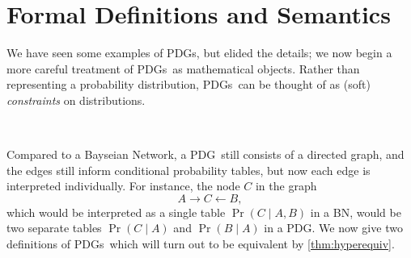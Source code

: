 \documentclass{article}
\newcommand{\MN}{PDG}
\newcommand{\MNs}{\MN s}
\begin{document}
	
	



	
	
	\section{Formal Definitions and Semantics}\label{sec:formal+semantics}
	
	
	We have seen some examples of \MNs, but elided the details; we now begin a more careful treatment of \MNs\ as mathematical objects. Rather than representing a probability distribution, \MNs\ can be thought of as (soft) \emph{constraints} on distributions.

	
	
	
	
	\todo\
	
	
	Compared to a Bayseian Network, a \MN\ still consists of a directed graph, and the edges still inform conditional probability tables, but now each edge is interpreted individually. For instance, the node $C$ in the graph
	\[ A \!\rightarrow\! C \!\leftarrow\! B,\]
	which would be interpreted as a single table $\Pr(C\mid A, B)$ in a BN, would be two separate tables $\Pr(C \mid A)$ and $\Pr(B \mid A)$ in a \MN. We now give two definitions of \MNs\, which will turn out to be equivalent by \cref{thm:hyperequiv}.
\end{document}
